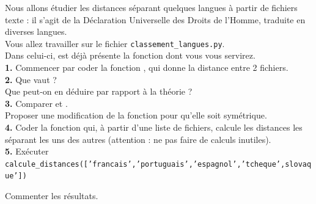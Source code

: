 \documentclass[a4paper,12pt,french]{book}
\begin{document}
\begin{exercice}
Nous allons étudier les distances séparant quelques langues à partir de fichiers texte : il s'agit de la Déclaration Universelle des Droits de 
l'Homme, traduite en diverses langues.\\
Vous allez travailler sur le fichier \texttt{classement\_langues.py}.\\
Dans celui-ci, est déjà présente la fonction  dont vous vous servirez.\\

\textbf{1.} Commencer par coder la fonction , qui donne la distance entre 2 fichiers.\\

\textbf{2.} Que vaut  ?\\
 Que peut-on en déduire par rapport à la théorie ?\\



\textbf{3.} Comparer  et  .\\
Proposer une modification de la fonction  pour qu'elle soit symétrique.\\



\textbf{4.} Coder la fonction  qui, à partir d'une liste de fichiers, calcule les distances les séparant les uns des autres 
(attention : ne pas faire de calculs inutiles).\\

\textbf{5.} Exécuter \\

\texttt{calcule_distances(['francais','portuguais','espagnol','tcheque',slovaque'])}

Commenter les résultats.\\

\end{exercice}
\end{document}
